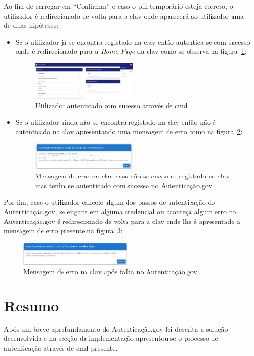 Ao fim de carregar em ``Confirmar'' e caso o \acrshort{pin} temporário esteja correto, o utilizador é redirecionado de volta para a \acrshort{clav} onde aparecerá ao utilizador uma de duas hipóteses:
\begin{itemize}
    \item Se o utilizador já se encontra registado na \acrshort{clav} então autentica-se com sucesso onde é redirecionado para a \textit{Home Page} da \acrshort{clav} como se observa na figura~\ref{fig:CMDauthSuc}:
    \begin{figure}[H]
        \centering
        \includegraphics[width=0.5\textwidth]{img/CMDauthSuc.png}
        \caption{Utilizador autenticado com sucesso através de \acrshort{cmd}\label{fig:CMDauthSuc}}
    \end{figure}
    \item Se o utilizador ainda não se encontra registado na \acrshort{clav} então não é autenticado na \acrshort{clav} apresentando uma mensagem de erro como na figura~\ref{fig:CMDnotReg}:
    \begin{figure}[H]
        \centering
        \includegraphics[width=0.5\textwidth]{img/CMDnotReg.png}
        \caption{Mensagem de erro na \acrshort{clav} caso não se encontre registado na \acrshort{clav} mas tenha se autenticado com sucesso no Autenticação.gov\label{fig:CMDnotReg}}
    \end{figure}
\end{itemize}

Por fim, caso o utilizador cancele algum dos passos de autenticação do Autenticação.gov, se engane em alguma credencial ou aconteça algum erro no Autenticação.gov é redirecionado de volta para a \acrshort{clav} onde lhe é apresentado a mensagem de erro presente na figura~\ref{fig:CMDerror}:

\begin{figure}[H]
    \centering
    \includegraphics[width=0.5\textwidth]{img/CMDerror.png}
    \caption{Mensagem de erro na \acrshort{clav} após falha no Autenticação.gov\label{fig:CMDerror}}
\end{figure}

\section{Resumo}

Após um breve aprofundamento do Autenticação.gov foi descrita a solução desenvolvida e na secção da implementação apresentou-se o processo de autenticação através de \acrlong{cmd} presente.
